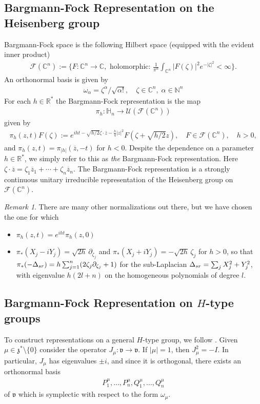 \documentclass[11pt]{amsart}
\theoremstyle{plain}
\theoremstyle{definition}
\theoremstyle{remark}
\newtheorem{remark}[theorem]{Remark}
\numberwithin{equation}{section}
\def\cU{\mathcal{U}}
\def\cF{\mathcal{F}}
\def\R{{\mathbb R}}%
\def\C{{\mathbb C}}%
\def\N{{\mathbb N}}%
\def \heis {\mathbb{H}}
\numberwithin{equation}{section}
\begin{document}
\subsection{Bargmann-Fock  Representation on the Heisenberg group}\label{BF}
Bargmann-Fock space is the following Hilbert space (equipped with the evident inner product)
\begin{align*}
	\cF(\C^n):=\{F: \C^n\to \C, \text{ holomorphic: }\frac{1}{\pi^n}\int_{\C^n}|F(\zeta)|^2e^{-|\zeta|^2}<\infty\}.
\end{align*}
An orthonormal basis is given by
\begin{align*}
	\omega_\alpha=\zeta^\alpha/\sqrt{\alpha!}, \quad \zeta\in \C^n, \; \alpha\in \N^n 
\end{align*}
For each $h\in \R^*$ the Bargmann-Fock representation is the map
\begin{align*}
	{\pi}_h: \heis_n \to \cU(\cF(\C^n))
\end{align*}
given by 
\begin{align*}
	{\pi}_{h}(z, t)F(\zeta):=e^{i ht-\sqrt{h/2}\zeta\cdot\overline{z}-\tfrac{ h}{4}|z|^2}F(\zeta+\sqrt{h/2}z), \quad F\in \cF(\C^n), \quad h>0,
\end{align*}
and ${\pi}_h(z, t)={\pi}_{|h|}(\overline{z}, -t)$ for $h<0$. Despite the dependence on a parameter $h\in \R^*$, we simply refer to this as \textit{the} Bargmann-Fock representation. Here $\zeta\cdot \overline{z}=\zeta_1\overline{z}_1+\cdots + \zeta_n\overline{z}_n$. The Bargmann-Fock representation is a strongly continuous unitary irreducible representation of the Heisenberg group on $\cF(\C^n)$. 

\begin{remark}
	There are many other normalizations out there, but we have chosen the one for which
	\begin{itemize}
		\item ${\pi}_h(z, t)=e^{iht}{\pi}_h(z, 0)$
		\item ${\pi}_*(X_j-iY_j)=\sqrt{2h}\,\partial_{\zeta_j}$ and ${\pi}_*(X_j+iY_j)=-\sqrt{2h}\,\zeta_j$ for $h>0$, so that $\pi_*(-\Delta_{\rm{sr}})=h\sum_{j=1}^n(2\zeta_j\partial_{\zeta_j}+1)$ for the sub-Laplacian $\Delta_{\rm{sr}}=\sum_j X_j^2+Y_j^2$, with eigenvalue $h(2l+n)$ on the homogeneous polynomials of degree $l$.
	\end{itemize}
\end{remark}

\subsection{Bargmann-Fock  Representation on $H$-type groups}\label{BargmannFock}
To construct representations on a general $H$-type group, we follow  \cite{mullerSharpLpEstimates2008}. Given $\mu\in \mathfrak{z}^*\setminus\{0\}$ consider the operator $J_\mu:\mathfrak{v}\to\mathfrak{v}$. If $|\mu|=1$, then $J_\mu^2=-I$. In particular, $J_\mu$ has eigenvalues $\pm i$, and since it is orthogonal, there exists an orthonormal basis 
\begin{align}
	P_1^\mu, \ldots, P^\mu_n, Q_1^\mu, \ldots, Q_n^\mu\label{symplecticBasis}
\end{align}
of $\mathfrak{v}$ which is symplectic with respect to the form $\omega_\mu$. 
\end{document}
